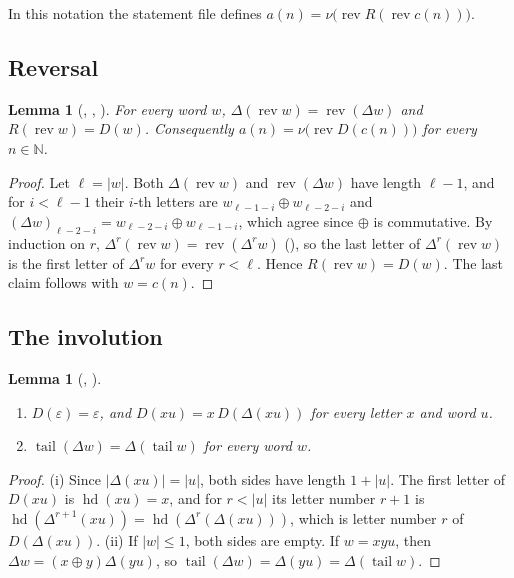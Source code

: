 \documentclass[11pt]{amsart}
\theoremstyle{plain}
\newtheorem{lemma}[theorem]{Lemma}
\theoremstyle{definition}
\newcommand{\N}{\mathbb{N}}
\newcommand{\rev}{\operatorname{rev}}
\newcommand{\hd}{\operatorname{hd}}
\newcommand{\tl}{\operatorname{tail}}
\newcommand{\len}[1]{\lvert #1\rvert}
\begin{document}
In this notation the statement file defines $a(n)=\nu\bigl(\rev R(\rev c(n))\bigr)$.

\subsection{Reversal}

\begin{lemma}[, , ]\label{lem:rev}
For every word $w$, $\Delta(\rev w)=\rev(\Delta w)$ and $R(\rev w)=D(w)$. Consequently $a(n)=\nu\bigl(\rev D(c(n))\bigr)$ for every $n\in\N$.
\end{lemma}

\begin{proof}
Let $\ell=\len w$. Both $\Delta(\rev w)$ and $\rev(\Delta w)$ have length $\ell-1$, and for $i<\ell-1$ their $i$-th letters are $w_{\ell-1-i}\oplus w_{\ell-2-i}$ and $(\Delta w)_{\ell-2-i}=w_{\ell-2-i}\oplus w_{\ell-1-i}$, which agree since $\oplus$ is commutative. By induction on $r$, $\Delta^r(\rev w)=\rev(\Delta^rw)$ (), so the last letter of $\Delta^r(\rev w)$ is the first letter of $\Delta^rw$ for every $r<\ell$. Hence $R(\rev w)=D(w)$. The last claim follows with $w=c(n)$.
\end{proof}


\subsection{The involution}

\begin{lemma}[, ]\label{lem:rec}
\begin{enumerate}
\item[(i)] $D(\varepsilon)=\varepsilon$, and $D(xu)=x\,D(\Delta(xu))$ for every letter $x$ and word $u$.
\item[(ii)] $\tl(\Delta w)=\Delta(\tl w)$ for every word $w$.
\end{enumerate}
\end{lemma}

\begin{proof}
(i) Since $\len{\Delta(xu)}=\len u$, both sides have length $1+\len u$. The first letter of $D(xu)$ is $\hd(xu)=x$, and for $r<\len u$ its letter number $r+1$ is $\hd(\Delta^{r+1}(xu))=\hd(\Delta^r(\Delta(xu)))$, which is letter number $r$ of $D(\Delta(xu))$.
(ii) If $\len w\le1$, both sides are empty. If $w=xyu$, then $\Delta w=(x\oplus y)\Delta(yu)$, so $\tl(\Delta w)=\Delta(yu)=\Delta(\tl w)$.
\end{proof}
\end{document}
